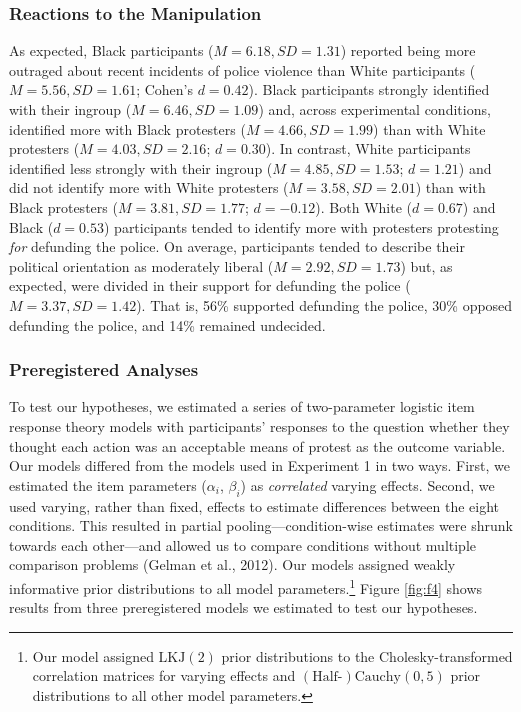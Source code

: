 \documentclass[twocolumn, 11pt, letterpaper]{article}
\begin{document}
\hypertarget{reactions-to-the-manipulation-1}{%
\subsubsection{Reactions to the
Manipulation}\label{reactions-to-the-manipulation-1}}

As expected, Black participants (\(M = 6.18, \textit{SD} = 1.31\))
reported being more outraged about recent incidents of police violence
than White participants (\(M = 5.56, \textit{SD} = 1.61\); Cohen's
\(d = 0.42\)). Black participants strongly identified with their ingroup
(\(M = 6.46, \textit{SD} = 1.09\)) and, across experimental conditions,
identified more with Black protesters (\(M = 4.66, \textit{SD} = 1.99\))
than with White protesters (\(M = 4.03, \textit{SD} = 2.16\);
\(d = 0.30\)). In contrast, White participants identified less strongly
with their ingroup (\(M = 4.85, \textit{SD} = 1.53\); \(d = 1.21\)) and
did not identify more with White protesters
(\(M = 3.58, \textit{SD} = 2.01\)) than with Black protesters
(\(M = 3.81, \textit{SD} = 1.77\); \(d = -0.12\)). Both White
(\(d = 0.67\)) and Black (\(d = 0.53\)) participants tended to identify
more with protesters protesting \emph{for} defunding the police. On
average, participants tended to describe their political orientation as
moderately liberal (\(M = 2.92, \textit{SD} = 1.73\)) but, as expected,
were divided in their support for defunding the police
(\(M = 3.37, \textit{SD} = 1.42\)). That is, 56\% supported defunding
the police, 30\% opposed defunding the police, and 14\% remained
undecided.

\hypertarget{preregistered-analyses-1}{%
\subsubsection{Preregistered Analyses}\label{preregistered-analyses-1}}

To test our hypotheses, we estimated a series of two-parameter logistic
item response theory models with participants' responses to the question
whether they thought each action was an acceptable means of protest as
the outcome variable. Our models differed from the models used in
Experiment 1 in two ways. First, we estimated the item parameters
(\(\alpha_i\), \(\beta_i\)) as \emph{correlated} varying effects.
Second, we used varying, rather than fixed, effects to estimate
differences between the eight conditions. This resulted in partial
pooling---condition-wise estimates were shrunk towards each other---and
allowed us to compare conditions without multiple comparison problems
(Gelman et al., 2012). Our models assigned weakly informative prior
distributions to all model parameters.\footnote{Our model assigned
  \(\text{LKJ} (2)\) prior distributions to the Cholesky-transformed
  correlation matrices for varying effects and
  \((\text{Half-})\text{Cauchy} (0, 5)\) prior distributions to all
  other model parameters.} Figure \ref{fig:f4} shows results from three
preregistered models we estimated to test our hypotheses.
\end{document}
